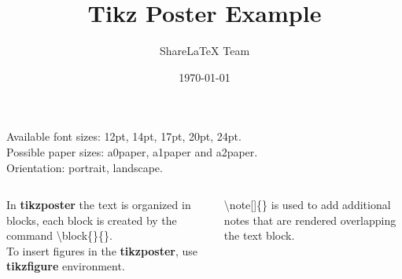 \documentclass[25pt, a0paper, portrait]{tikzposter}
\title{Tikz Poster Example}
\author{ShareLaTeX Team}
\date{\today}
\institute{ShareTeX Institute}
\begin{document}
\maketitle

{
    Available font sizes: 12pt, 14pt, 17pt, 20pt, 24pt.	\\
    Possible paper sizes: a0paper, a1paper and a2paper.	\\
    Orientation: portrait, landscape. \\
}

\begin{columns}
    {
	In \textbf{tikzposter} the text is organized in blocks, each
	block is created by the command \textbackslash{}block\{\}\{\}.  \\
	To insert figures in the \textbf{tikzposter}, use \textbf{tikzfigure}
	environment.
    }

    {
	\textbackslash{}note[]\{\} is used to add additional notes that are rendered
	overlapping the text block. \\

	\vspace{3cm}
    }
\end{columns}
\end{document}
